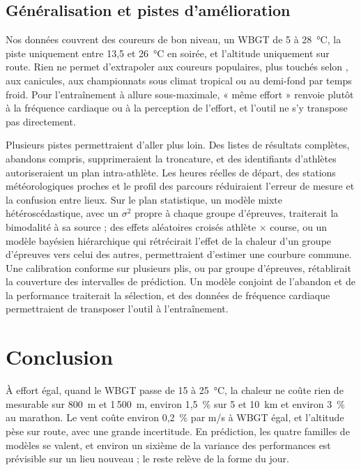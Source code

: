 \documentclass[11pt,a4paper]{article}
\begin{document}
\subsection{Généralisation et pistes d'amélioration}\label{sec:generalisation}

Nos données couvrent des coureurs de bon niveau, un WBGT de 5 à 28~°C, la piste uniquement entre 13,5 et 26~°C en
soirée, et l'altitude uniquement sur route. Rien ne permet d'extrapoler aux coureurs populaires, plus touchés selon
\citet{ely2007}, aux canicules, aux championnats sous climat tropical ou au demi-fond par temps froid. Pour
l'entraînement à allure sous-maximale, « même effort » renvoie plutôt à la fréquence cardiaque ou à la perception de
l'effort, et l'outil ne s'y transpose pas directement.

Plusieurs pistes permettraient d'aller plus loin. Des listes de résultats complètes, abandons compris, supprimeraient
la troncature, et des identifiants d'athlètes autoriseraient un plan intra-athlète. Les heures réelles de départ, des
stations météorologiques proches et le profil des parcours réduiraient l'erreur de mesure et la confusion entre lieux.
Sur le plan statistique, un modèle mixte hétéroscédastique, avec un $\sigma^2$ propre à chaque groupe d'épreuves,
traiterait la bimodalité à sa source ; des effets aléatoires croisés athlète $\times$ course, ou un modèle bayésien
hiérarchique qui rétrécirait l'effet de la chaleur d'un groupe d'épreuves vers celui des autres, permettraient
d'estimer une courbure commune. Une calibration conforme sur plusieurs plis, ou par groupe d'épreuves, rétablirait la
couverture des intervalles de prédiction. Un modèle conjoint de l'abandon et de la performance traiterait la
sélection, et des données de fréquence cardiaque permettraient de transposer l'outil à l'entraînement.

\section{Conclusion}\label{sec:conclusion}

À effort égal, quand le WBGT passe de 15 à 25~°C, la chaleur ne coûte rien de mesurable sur 800~m et 1\,500~m,
environ 1,5~\% sur 5 et 10~km et environ 3~\% au marathon. Le vent coûte environ 0,2~\% par m/s à WBGT égal, et
l'altitude pèse sur route, avec une grande incertitude. En prédiction, les quatre familles de modèles se valent, et
environ un sixième de la variance des performances est prévisible sur un lieu nouveau ; le reste relève de la forme du
jour.
\end{document}
